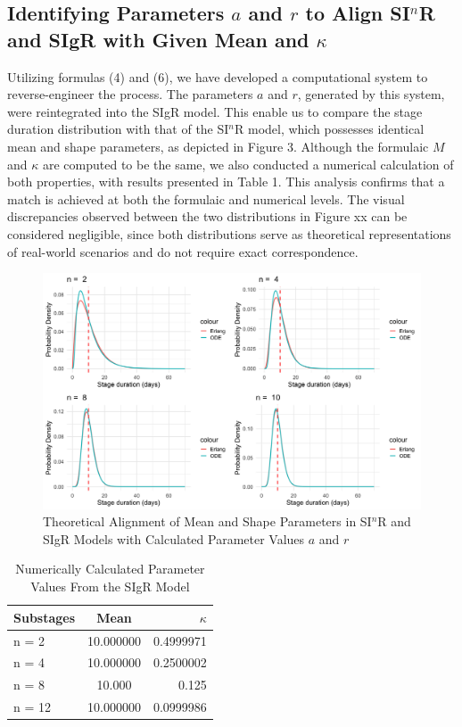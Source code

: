 \documentclass[12pt]{article}
\begin{document}
\subsection{Identifying Parameters $a$ and $r$ to Align SI$^n$R and SIgR with Given Mean and $\kappa$}
Utilizing formulas (4) and (6), we have developed a computational system to reverse-engineer the process. The parameters $a$ and $r$, generated by this system, were reintegrated into the SIgR model. This enable us to compare the stage duration distribution with that of the SI$^n$R model, which possesses identical mean and shape parameters, as depicted in Figure 3. Although the formulaic $M$ and $\kappa$ are computed to be the same, we also conducted a numerical calculation of both properties, with results presented in Table 1. This analysis confirms that a match is achieved at both the formulaic and numerical levels. The visual discrepancies observed between the two distributions in Figure xx can be considered negligible, since both distributions serve as theoretical representations of real-world scenarios and do not require exact correspondence.
\begin{figure}[h]
    \centering
    \includegraphics[width= \textwidth]{4.3.1.png}
    \caption{Theoretical Alignment of Mean and Shape Parameters in SI$^n$R and SIgR Models with Calculated Parameter Values $a$ and $r$}
\end{figure}

\begin{table}[h!]
    \centering
    \begin{tabular}{ l | c | r }
      \hline
      Substages & Mean & $\kappa$ \\
      \hline
      n = 2 & 10.000000 & 0.4999971 \\
      n = 4 & 10.000000 & 0.2500002 \\
      n = 8 & 10.000 & 0.125 \\
      n = 12 & 10.000000 & 0.0999986 \\
      \hline
    \end{tabular}
    \caption{Numerically Calculated Parameter Values From the SIgR Model}
\end{table}
\end{document}
